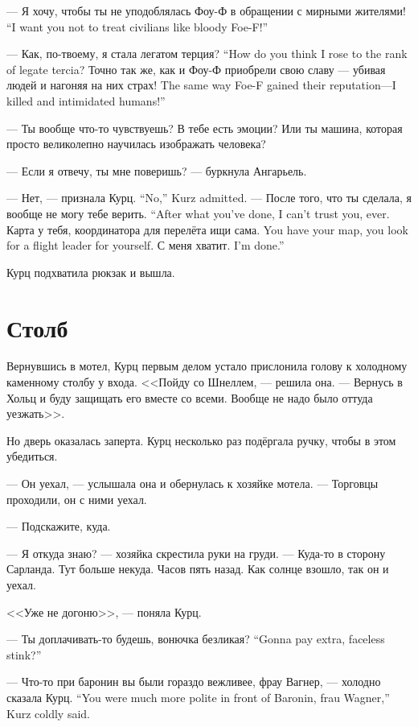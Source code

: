 {--- Я хочу, чтобы ты не уподоблялась Фоу-Ф в обращении с мирными жителями!}
{``I want you not to treat civilians like bloody Foe-F!''}

{--- Как, по-твоему, я стала легатом терция?}
{``How do you think I rose to the rank of legate tercia?}
{Точно так же, как и Фоу-Ф приобрели свою славу --- убивая людей и нагоняя на них страх!}
{The same way Foe-F gained their reputation---I killed and intimidated humans!''}

--- Ты вообще что-то чувствуешь?
В тебе есть эмоции?
Или ты машина, которая просто великолепно научилась изображать человека?

--- Если я отвечу, ты мне поверишь? --- буркнула Ангарьель.

{--- Нет, --- признала Курц.}
{``No,'' Kurz admitted.}
{--- После того, что ты сделала, я вообще не могу тебе верить.}
{``After what you've done, I can't trust you, ever.}
{Карта у тебя, координатора для перелёта ищи сама.}
{You have your map, you look for a flight leader for yourself.}
{С меня хватит.}
{I'm done.''}

Курц подхватила рюкзак и вышла.

\section{Столб}

Вернувшись в мотел, Курц первым делом устало прислонила голову к холодному каменному столбу у входа.
<<Пойду со Шнеллем, --- решила она.
--- Вернусь в Хольц и буду защищать его вместе со всеми.
Вообще не надо было оттуда уезжать>>.

Но дверь оказалась заперта.
Курц несколько раз подёргала ручку, чтобы в этом убедиться.

--- Он уехал, --- услышала она и обернулась к хозяйке мотела.
--- Торговцы проходили, он с ними уехал.

--- Подскажите, куда.

--- Я откуда знаю? --- хозяйка скрестила руки на груди.
--- Куда-то в сторону Сарланда.
Тут больше некуда.
Часов пять назад.
Как солнце взошло, так он и уехал.

<<Уже не догоню>>, --- поняла Курц.

{--- Ты доплачивать-то будешь, вонючка безликая?}
{``Gonna pay extra, faceless stink?''}

{--- Что-то при баронин вы были гораздо вежливее, фрау Вагнер, --- холодно сказала Курц.}
{``You were much more polite in front of Baronin, frau Wagner,'' Kurz coldly said.}


